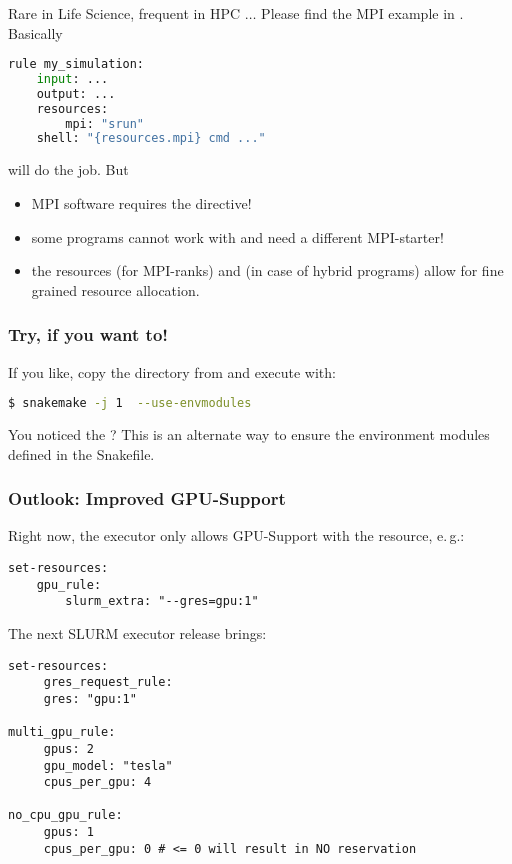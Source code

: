 \begin{frame}[fragile]
	\frametitle{}
	Rare in Life Science, frequent in HPC $\ldots$\newline
	Please find the MPI example in . Basically
	\begin{lstlisting}[language=Python,style=Python]
rule my_simulation:
    input: ...
    output: ...
    resources:
        mpi: "srun"
    shell: "{resources.mpi} cmd ..."
    \end{lstlisting}
    will do the job. But
    \begin{warning}
    	\begin{itemize}[<+->]
    		\item MPI software requires the  directive!
    		\item some programs cannot work with  and need a different MPI-starter!
    		\item the resources  (for MPI-ranks) and  (in case of hybrid programs) allow for fine grained resource allocation.
    	\end{itemize}
    \end{warning}
\end{frame}

\begin{frame}[fragile]
	\frametitle{Try, if you want to!}
	If you like, copy the  directory from  and execute with:
	\begin{lstlisting}[language=Bash, style=Shell]	
$ snakemake -j 1  --use-envmodules
    \end{lstlisting}
    \begin{hint}
    	You noticed the ? This is an alternate way to ensure the environment modules defined in the Snakefile.
    \end{hint}
\end{frame}

\begin{frame}[fragile]
	\frametitle{Outlook: Improved GPU-Support}
	Right now, the executor only allows GPU-Support with the  resource, e.\,g.:
    \begin{lstlisting}[style=Plain]
set-resources:
    gpu_rule:
        slurm_extra: "--gres=gpu:1"   	
    \end{lstlisting}\pause
    The next SLURM executor release brings:
        \begin{lstlisting}[style=Plain]
set-resources:
     gres_request_rule:
     gres: "gpu:1"

multi_gpu_rule:
     gpus: 2
     gpu_model: "tesla" 
     cpus_per_gpu: 4

no_cpu_gpu_rule:
     gpus: 1
     cpus_per_gpu: 0 # <= 0 will result in NO reservation
    \end{lstlisting}
\end{frame}
